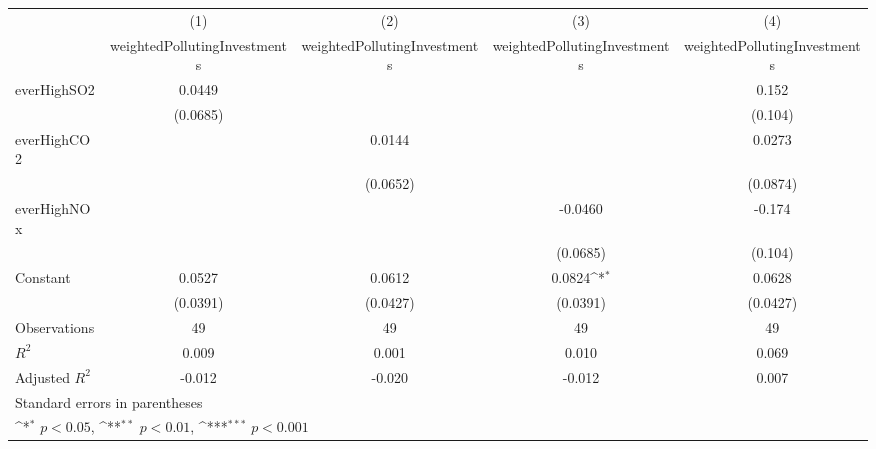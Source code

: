 {
\def\sym#1{\ifmmode^{#1}\else\(^{#1}\)\fi}
\begin{tabular}{l*{4}{c}}
\toprule
                    &\multicolumn{1}{c}{(1)}&\multicolumn{1}{c}{(2)}&\multicolumn{1}{c}{(3)}&\multicolumn{1}{c}{(4)}\\
                    &\multicolumn{1}{c}{weightedPollutingInvestments}&\multicolumn{1}{c}{weightedPollutingInvestments}&\multicolumn{1}{c}{weightedPollutingInvestments}&\multicolumn{1}{c}{weightedPollutingInvestments}\\
\midrule
everHighSO2         &      0.0449         &                     &                     &       0.152         \\
                    &    (0.0685)         &                     &                     &     (0.104)         \\
\addlinespace
everHighCO2         &                     &      0.0144         &                     &      0.0273         \\
                    &                     &    (0.0652)         &                     &    (0.0874)         \\
\addlinespace
everHighNOx         &                     &                     &     -0.0460         &      -0.174         \\
                    &                     &                     &    (0.0685)         &     (0.104)         \\
\addlinespace
Constant            &      0.0527         &      0.0612         &      0.0824\sym{*}  &      0.0628         \\
                    &    (0.0391)         &    (0.0427)         &    (0.0391)         &    (0.0427)         \\
\midrule
Observations        &          49         &          49         &          49         &          49         \\
\(R^{2}\)           &       0.009         &       0.001         &       0.010         &       0.069         \\
Adjusted \(R^{2}\)  &      -0.012         &      -0.020         &      -0.012         &       0.007         \\
\bottomrule
\multicolumn{5}{l}{\footnotesize Standard errors in parentheses}\\
\multicolumn{5}{l}{\footnotesize \sym{*} \(p<0.05\), \sym{**} \(p<0.01\), \sym{***} \(p<0.001\)}\\
\end{tabular}
}
